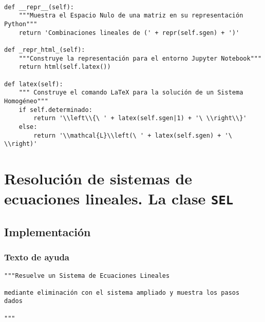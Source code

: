 \documentclass[11pt]{report}
\begin{document}
\begin{verbatim}

def __repr__(self):
    """Muestra el Espacio Nulo de una matriz en su representación Python"""
    return 'Combinaciones lineales de (' + repr(self.sgen) + ')'

def _repr_html_(self):
    """Construye la representación para el entorno Jupyter Notebook"""
    return html(self.latex())

def latex(self):
    """ Construye el comando LaTeX para la solución de un Sistema Homogéneo"""
    if self.determinado:
        return '\\left\\{\ ' + latex(self.sgen|1) + '\ \\right\\}'
    else:
        return '\\mathcal{L}\\left(\ ' + latex(self.sgen) + '\ \\right)' 

\end{verbatim}


\chapter{Resolución de sistemas de ecuaciones lineales. La clase  \texttt{SEL}}
\label{sec:orgdfd72d5}

\section{Implementación}
\label{sec:org01a70b8}
\subsection{Texto de ayuda}
\label{sec:org09ee728}

\begin{verbatim}
"""Resuelve un Sistema de Ecuaciones Lineales

mediante eliminación con el sistema ampliado y muestra los pasos
dados

"""
\end{verbatim}
\end{document}
